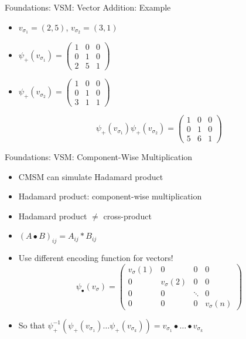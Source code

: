 \documentclass[12pt,a4paper]{beamer}
\begin{document}
\begin{frame}{Foundations: VSM: Vector Addition: Example}
\begin{itemize}
\item $v_{\sigma_{1}} = (2,5)$, $v_{\sigma_{2}} = (3,1)$
\item $\psi_{+}(v_{\sigma_{1}}) = \left( \begin{array}{cc|c}
1 & 0 & 0 \\
0 & 1 & 0 \\
2 & 5 & 1 \end{array} \right) $
\item  $\psi_{+}(v_{\sigma_{2}}) = \left( \begin{array}{cc|c}
1 & 0 & 0 \\
0 & 1 & 0 \\
3 & 1 & 1 \end{array} \right) $

$$ \psi_{+}(v_{\sigma_{1}}) \psi_{+}(v_{\sigma_{2}}) = 
\left( \begin{array}{cc|c}
1 & 0 & 0 \\
0 & 1 & 0 \\
5 & 6 & 1 \end{array} \right)
$$
\end{itemize}
\end{frame}

\begin{frame}{Foundations: VSM: Component-Wise Multiplication}
\begin{itemize}
\item CMSM can simulate Hadamard product
\item Hadamard product: component-wise multiplication
\item Hadamard product $\neq$ cross-product
\item $(A \bullet B)_{ij} = A_{ij} * B_{ij}$
\item Use different encoding function for vectors!
$$  \psi_{\bullet}(v_{\sigma}) =
\left( \begin{array}{cccc}
v_{\sigma}(1) & 0 & 0 & 0 \\
0 & v_{\sigma}(2) & 0 & 0 \\
0 & 0 & \ddots & 0 \\
0 & 0 & 0 & v_{\sigma}(n) \end{array} \right) $$

\item So that $\psi_{+}^{-1} (\psi_{+}(v_{\sigma_{1}}) \ldots \psi_{+}(v_{\sigma_{k}})) = v_{\sigma_{1}} \bullet \ldots \bullet v_{\sigma_{k}}$


\end{itemize}
\end{frame}
\end{document}

